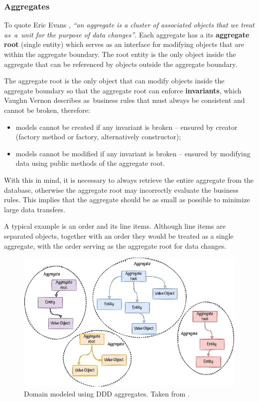 \newpage
\subsubsection{Aggregates}
\label{ddd:aggregate}
To quote Eric Evans \cite{eric_evans:ddd}, \textit{``an aggregate is a cluster of associated objects that we treat as~a~unit for the purpose of data changes''}. Each aggregate has a its \textbf{aggregate root} (single entity) which serves as an interface for modifying objects that are within the aggregate boundary. The root entity is the only object inside the aggregate that can be referenced by objects outside the aggregate boundary.

The aggregate root is the only object that can modify objects inside the aggregate boundary so that the aggregate root can enforce \textbf{invariants}, which Vaughn Vernon \cite{vv:impl_ddd} describes as~business rules that must always be consistent and cannot be broken, therefore:

\begin{itemize}
    \item models cannot be created if any invariant is broken  -- ensured by creator (factory method or factory, alternatively constructor);
    \item models cannot be modified if any invariant is broken -- ensured by modifying data using public methods of the aggregate root.
\end{itemize}

With this in mind, it is necessary to always retrieve the entire aggregate from the database, otherwise the aggregate root may incorrectly evaluate the business rules. This implies that the aggregate should be as small as possible to minimize large data transfers.

A typical example is an order and its line items. Although line items are separated objects, together with an order they would be treated as a single aggregate, with the order serving as the aggregate root for data changes.

\begin{figure} [H]
    \centering
    \includegraphics[width=\textwidth]{figures/aggregates.png}
    \caption{Domain modeled using DDD aggregates. Taken from \cite{albert_llousas:design_ddd_aggregates}.}
    \label{fig:ddd_aggregate}
\end{figure}

